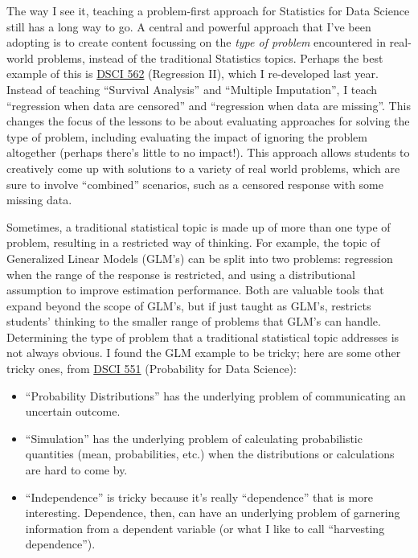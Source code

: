 \documentclass[]{article}
\providecommand{\tightlist}{%
  \setlength{\itemsep}{0pt}\setlength{\parskip}{0pt}}
\begin{document}
The way I see it, teaching a problem-first approach for Statistics for Data Science still has a long way to go. A central and powerful approach that I've been adopting is to create content focussing on the \emph{type of problem} encountered in real-world problems, instead of the traditional Statistics topics. Perhaps the best example of this is \href{https://ubc-mds.github.io/DSCI_562_regr-2/}{DSCI 562} (Regression II), which I re-developed last year. Instead of teaching ``Survival Analysis'' and ``Multiple Imputation'', I teach ``regression when data are censored'' and ``regression when data are missing''. This changes the focus of the lessons to be about evaluating approaches for solving the type of problem, including evaluating the impact of ignoring the problem altogether (perhaps there's little to no impact!). This approach allows students to creatively come up with solutions to a variety of real world problems, which are sure to involve ``combined'' scenarios, such as a censored response with some missing data.

Sometimes, a traditional statistical topic is made up of more than one type of problem, resulting in a restricted way of thinking. For example, the topic of Generalized Linear Models (GLM's) can be split into two problems: regression when the range of the response is restricted, and using a distributional assumption to improve estimation performance. Both are valuable tools that expand beyond the scope of GLM's, but if just taught as GLM's, restricts students' thinking to the smaller range of problems that GLM's can handle.
Determining the type of problem that a traditional statistical topic addresses is not always obvious. I found the GLM example to be tricky; here are some other tricky ones, from \href{https://ubc-mds.github.io/DSCI_551_stat-prob-dsci/lectures/}{DSCI 551} (Probability for Data Science):

\begin{itemize}
\tightlist
\item
  ``Probability Distributions'' has the underlying problem of communicating an uncertain outcome.
\item
  ``Simulation'' has the underlying problem of calculating probabilistic quantities (mean, probabilities, etc.) when the distributions or calculations are hard to come by.
\item
  ``Independence'' is tricky because it's really ``dependence'' that is more interesting. Dependence, then, can have an underlying problem of garnering information from a dependent variable (or what I like to call ``harvesting dependence'').
\end{itemize}
\end{document}
